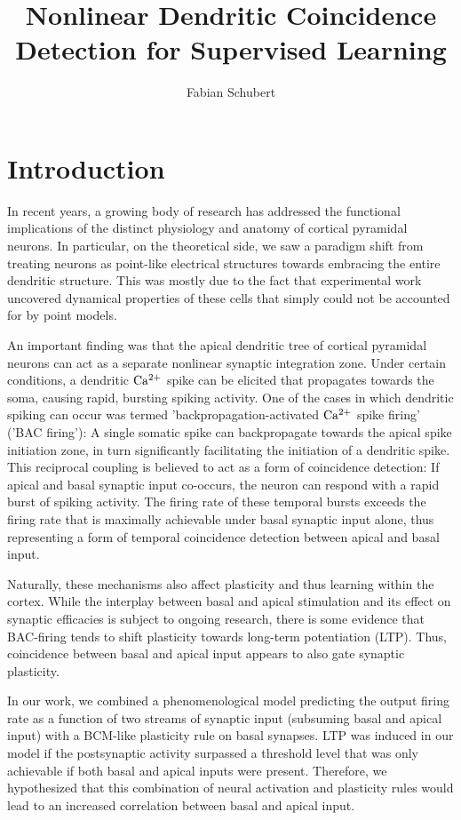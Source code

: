 \documentclass[10pt,a4paper,twocolumn]{article}
\author{Fabian Schubert}
\title{Nonlinear Dendritic Coincidence Detection for Supervised Learning}
\begin{document}
	\maketitle

		\section{Introduction}
		
		In recent years, a growing body of research has addressed the 
		functional implications of the distinct physiology and anatomy of 
		cortical pyramidal neurons. In particular, on the theoretical side,
		we saw a paradigm shift from treating neurons as point-like electrical
		structures towards embracing the entire dendritic structure. This was 
		mostly due to the fact that experimental work uncovered dynamical properties
		of these cells that simply could not be accounted for by point models.
		
		An important finding was that the apical dendritic tree of
		cortical pyramidal neurons can act as a separate nonlinear synaptic 
		integration zone. Under certain conditions, a dendritic $\rm Ca^{2+}$ spike
		can be elicited that propagates towards the soma, causing rapid, bursting
		spiking activity. One of the cases in which dendritic spiking can occur
		was termed 'backpropagation-activated $\rm Ca^{2+}$ spike firing' 
		('BAC firing'): A single somatic spike can backpropagate towards the apical
		spike initiation zone, in turn significantly facilitating the initiation of 
		a dendritic spike. This reciprocal coupling is believed to act as a form of
		coincidence detection: If apical and basal synaptic input co-occurs, the 
		neuron can respond with a rapid burst of spiking activity. The firing rate
		of these temporal bursts exceeds the firing rate that is maximally achievable 
		under basal synaptic input alone, thus representing a form of temporal coincidence
		detection between apical and basal input.
		
		Naturally, these mechanisms also affect plasticity and thus learning
		within the cortex. While the interplay between basal and apical stimulation and
		its effect on synaptic efficacies is subject to ongoing research, there is
		some evidence that BAC-firing tends to shift plasticity towards long-term potentiation
		(LTP). Thus, coincidence between basal and apical input appears to also gate synaptic
		plasticity.
		
		In our work, we combined a phenomenological model predicting the output
		firing rate as a function of two streams of synaptic input (subsuming basal and apical input)
		with a BCM-like plasticity rule on basal synapses. LTP was induced in our model 
		if the postsynaptic activity surpassed a threshold level that was only achievable if 
		both basal and apical inputs were present. Therefore, we hypothesized that 
		this combination of neural activation and plasticity rules would lead to an
		increased correlation between basal and apical input.
		
\end{document}
